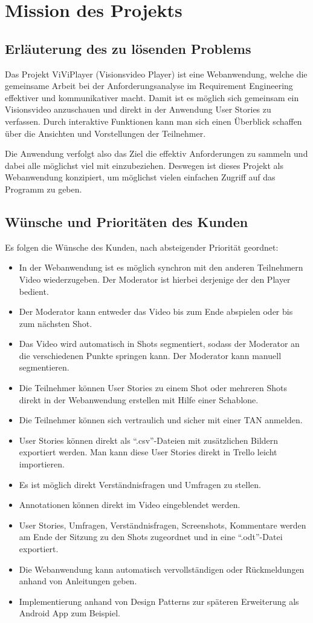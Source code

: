 \section{Mission des Projekts}

\subsection{Erläuterung des zu lösenden Problems}
Das Projekt ViViPlayer (Visionsvideo Player) ist eine Webanwendung, welche die gemeinsame Arbeit 
bei der Anforderungsanalyse im Requirement Engineering effektiver und kommunikativer macht.
Damit ist es möglich sich gemeinsam ein Visionsvideo anzuschauen und direkt in der Anwendung User Stories
zu verfassen. Durch interaktive Funktionen kann man sich einen Überblick schaffen über die Ansichten und Vorstellungen der Teilnehmer.

Die Anwendung verfolgt also das Ziel die effektiv Anforderungen zu sammeln und dabei alle möglichst viel mit einzubeziehen.
Deswegen ist dieses Projekt als Webanwendung konzipiert, um möglichst vielen einfachen Zugriff auf das Programm zu geben.

\subsection{Wünsche und Prioritäten des Kunden}
	Es folgen die Wünsche des Kunden, nach absteigender Priorität geordnet:
	\begin{itemize}
		\item In der Webanwendung ist es möglich synchron mit den anderen Teilnehmern Video wiederzugeben. Der Moderator ist hierbei derjenige der den Player bedient.
		\item Der Moderator kann entweder das Video bis zum Ende abspielen oder bis zum nächsten Shot.
		\item Das Video wird automatisch in Shots segmentiert, sodass der Moderator an die verschiedenen Punkte springen kann. Der Moderator kann manuell segmentieren.
		\item Die Teilnehmer können User Stories zu einem Shot oder mehreren Shots direkt in der Webanwendung erstellen mit Hilfe einer Schablone.
		\item Die Teilnehmer können sich vertraulich und sicher mit einer TAN anmelden.
		\item User Stories können direkt als ``.csv''-Dateien mit zusätzlichen Bildern exportiert werden. Man kann diese User Stories direkt in Trello leicht importieren.
		\item Es ist möglich direkt Verständnisfragen und Umfragen zu stellen.
		\item Annotationen können direkt im Video eingeblendet werden.
		\item User Stories, Umfragen, Verständnisfragen, Screenshots, Kommentare werden am Ende der Sitzung zu den Shots zugeordnet und in eine ``.odt''-Datei exportiert.
		\item Die Webanwendung kann automatisch vervollständigen oder Rückmeldungen anhand von Anleitungen geben.
		\item Implementierung anhand von Design Patterns zur späteren Erweiterung als Android App zum Beispiel.
	\end{itemize}

